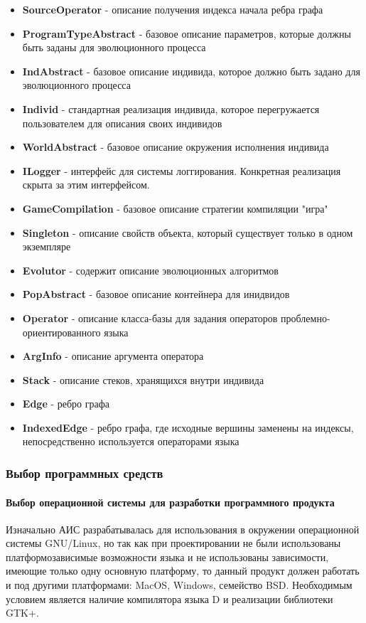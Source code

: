 \documentclass[russian,utf8,emptystyle]{eskdtext}
\begin{document}
\begin{spacing}{1.5}
\begin{itemize}
\item \textbf{SourceOperator} - описание получения индекса начала ребра графа
\item \textbf{ProgramTypeAbstract} - базовое описание параметров, которые должны быть заданы для эволюционного процесса
\item \textbf{IndAbstract} - базовое описание индивида, которое должно быть задано для эволюционного процесса
\item \textbf{Individ} - стандартная реализация индивида, которое перегружается пользователем для описания своих индивидов
\item \textbf{WorldAbstract} - базовое описание окружения исполнения индивида
\item \textbf{ILogger} - интерфейс для системы логгирования. Конкретная реализация скрыта за этим интерфейсом.
\item \textbf{GameCompilation} - базовое описание стратегии компиляции "игра"
\item \textbf{Singleton} - описание свойств объекта, который существует только в одном экземпляре
\item \textbf{Evolutor} - содержит описание эволюционных алгоритмов
\item \textbf{PopAbstract} - базовое описание контейнера для инидвидов
\item \textbf{Operator} - описание класса-базы для задания операторов проблемно-ориентированного языка
\item \textbf{ArgInfo} - описание аргумента оператора
\item \textbf{Stack}  - описание стеков, хранящихся внутри индивида
\item \textbf{Edge} - ребро графа
\item \textbf{IndexedEdge} - ребро графа, где исходные вершины заменены на индексы, непосредственно используется операторами языка
\end{itemize}

\subsubsection{Выбор программных средств}

\paragraph{Выбор операционной системы для разработки программного продукта}
Изначально АИС разрабатывалась для использования в окружении операционной системы GNU/Linux, но так как при проектировании не были использованы платформозависимые возможности языка и не использованы зависимости, имеющие только одну основную платформу, то данный продукт должен работать и под другими платформами: MacOS, Windows, семейство BSD. Необходимым условием является наличие компилятора языка D и реализации библиотеки GTK+.


\end{spacing}
\end{document}

